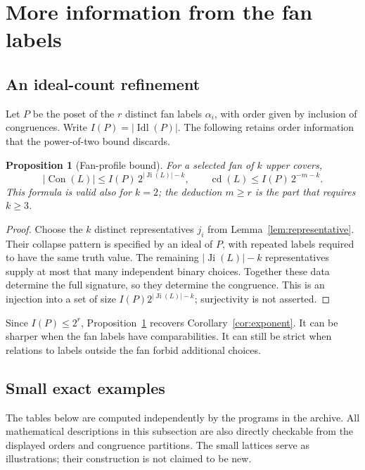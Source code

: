 \documentclass[11pt,a4paper]{article}
\numberwithin{equation}{section}
\newtheorem{proposition}[theorem]{Proposition}
\theoremstyle{definition}
\theoremstyle{remark}
\DeclareMathOperator{\Con}{Con}
\DeclareMathOperator{\Ji}{Ji}
\DeclareMathOperator{\Idl}{Idl}
\DeclareMathOperator{\cdens}{cd}
\newcommand{\card}[1]{\lvert #1\rvert}
\begin{document}
\section{More information from the fan labels}\label{sec:profiles}
\subsection{An ideal-count refinement}
Let $P$ be the poset of the $r$ distinct fan labels $\alpha_i$, with order given
by inclusion of congruences. Write $I(P)=\card{\Idl(P)}$.
The following retains order information that the power-of-two bound discards.

\begin{proposition}[Fan-profile bound]\label{prop:profile}
For a selected fan of $k$ upper covers,
\begin{equation}\label{eq:profile}
 \card{\Con(L)}\le I(P)\,2^{\card{\Ji(L)}-k},\qquad
 \cdens(L)\le I(P)\,2^{-m-k}.
\end{equation}
This formula is valid also for $k=2$; the deduction $m\ge r$ is the part that
requires $k\ge3$.
\end{proposition}
\begin{proof}
Choose the $k$ distinct representatives $j_i$ from
Lemma~\ref{lem:representative}. Their collapse pattern is specified by an ideal
of $P$, with repeated labels required to have the same truth value.
The remaining $\card{\Ji(L)}-k$ representatives supply at most that many
independent binary choices. Together these data determine the full signature,
so they determine the congruence. This is an injection into a set of size
$I(P)2^{\card{\Ji(L)}-k}$; surjectivity is not asserted.
\end{proof}

Since $I(P)\le2^r$, Proposition~\ref{prop:profile} recovers
Corollary~\ref{cor:exponent}. It can be sharper when the fan labels have
comparabilities. It can still be strict when relations to labels outside the
fan forbid additional choices.

\subsection{Small exact examples}
The tables below are computed independently by the programs in the archive.
All mathematical descriptions in this subsection are also directly checkable
from the displayed orders and congruence partitions. The small lattices serve
as illustrations; their construction is not claimed to be new.
\end{document}
